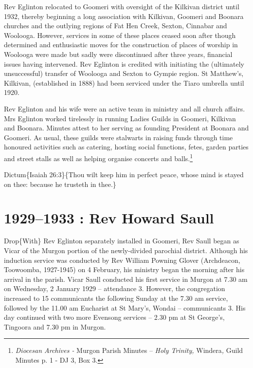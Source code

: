 Rev Eglinton relocated to Goomeri with oversight of the Kilkivan district until 1932, thereby beginning a long association with Kilkivan, Goomeri and Boonara churches and the outlying regions of Fat Hen Creek, Sexton, Cinnabar and Woolooga. However, services in some of these places ceased soon after though determined and enthusiastic moves for the construction of places of worship in Woolooga were made but sadly were discontinued after three years, financial issues having intervened. Rev Eglinton is credited with initiating the (ultimately unsuccessful) transfer of Woolooga and Sexton to Gympie region. St Matthew's, Kilkivan, (established in 1888) had been serviced under the Tiaro umbrella until 1920.

Rev Eglinton and his wife were an active team in ministry and all church affairs. Mrs Eglinton worked tirelessly in running Ladies Guilds in Goomeri, Kilkivan and Boonara. Minutes attest to her serving as founding President at Boonara and Goomeri. As usual, these guilds were stalwarts in raising funds through time honoured activities such as catering, hosting social functions, fetes, garden parties and street stalls as well as helping organise concerts and balls.\footnote{\emph{Diocesan Archives -} Murgon Parish Minutes -- \emph{Holy Trinity,} Windera\emph{,} Guild Minutes p. 1 - DJ 3, Box 3.}

Dictum\{Isaiah 26:3\}\{Thou wilt keep him in perfect peace, whose mind is stayed on thee: because he trusteth in thee.\}

\hypertarget{rev-howard-saull}{%
\chapter{1929--1933 : Rev Howard Saull}\label{rev-howard-saull}}

Drop\{With\} Rev Eglinton separately installed in Goomeri, Rev Saull began as Vicar of the Murgon portion of the newly-divided parochial district. Although his induction service was conducted by Rev William Powning Glover (Archdeacon, Toowoomba, 1927-1945) on 4 February, his ministry began the morning after his arrival in the parish. Vicar Saull conducted his first service in Murgon at 7.30 am on Wednesday, 2 January 1929 -- attendance 3. However, the congregation increased to 15 communicants the following Sunday at the 7.30 am service, followed by the 11.00 am Eucharist at St Mary's, Wondai -- communicants 3. His day continued with two more Evensong services -- 2.30 pm at St George's, Tingoora and 7.30 pm in Murgon.

